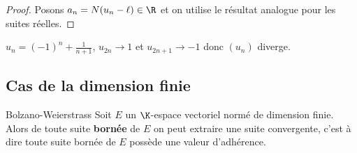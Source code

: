 \begin{proof}
    Posons $a_n = N(u_n - \ell) \in \R$ et on utilise le résultat analogue pour les suites réelles.
\end{proof}

\begin{exemple}
    $u_n = (-1)^n + \frac 1 {n+1}$, $u_{2n} \to 1$ et $u_{2n + 1} \to -1$ donc $(u_n)$ diverge.
\end{exemple}

\subsection{Cas de la dimension finie}

\begin{theorement}{Bolzano-Weierstrass}{}
    Soit $E$ un $\K$-espace vectoriel normé de dimension finie. Alors de toute suite
    \textbf{bornée} de $E$ on peut extraire une suite convergente, c'est à dire toute 
    suite bornée de $E$ possède une valeur d'adhérence. 
    
\end{theorement}


